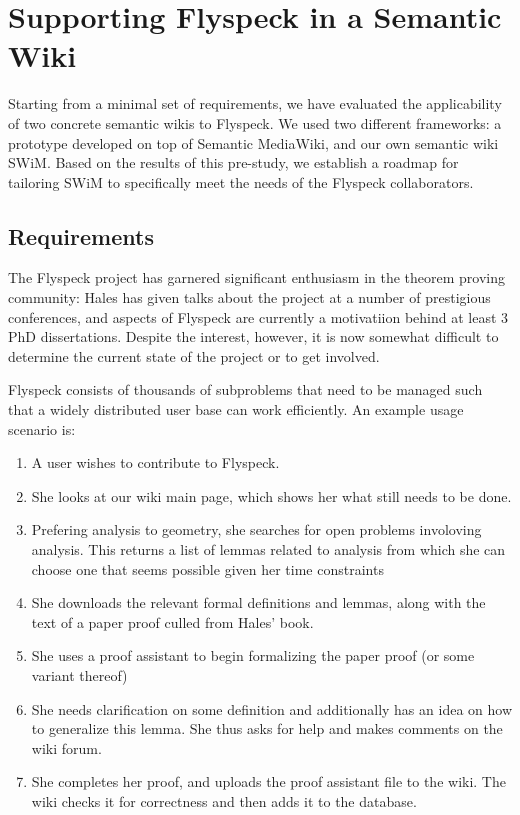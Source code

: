 
\section{Supporting Flyspeck in a Semantic Wiki}

Starting from a minimal set of requirements, we have evaluated the
applicability of two concrete semantic wikis to Flyspeck.  We used two
different frameworks: a prototype developed on top of Semantic
MediaWiki, and our own semantic wiki SWiM.  Based on the results of
this pre-study, we establish a roadmap for tailoring SWiM to
specifically meet the needs of the Flyspeck collaborators.

\subsection{Requirements}
\label{sec:req}

The Flyspeck project has garnered significant enthusiasm in the
theorem proving community: Hales has given talks about the project at
a number of prestigious conferences, and aspects of Flyspeck are
currently a motivatiion behind at least 3 PhD dissertations.  Despite
the interest, however, it is now somewhat difficult to determine the
current state of the project or to get involved.

  Flyspeck consists of thousands of subproblems that need to
be managed such that a widely distributed user base can work efficiently.  
An example usage scenario is:

\begin{enumerate}  
\item A user wishes to contribute to Flyspeck. 
\item She looks at our wiki main page, which shows her what still needs to be done. 
\item Prefering analysis to geometry, she searches for open problems involoving analysis.  
  This returns a list of lemmas related to analysis from which she can choose one that 
  seems possible given her time constraints 
\item She downloads the relevant formal definitions and lemmas, along with the text 
  of a paper proof culled from Hales' book. 
\item She uses a proof assistant to begin formalizing the paper proof (or some variant thereof) 
\item She needs clarification on some definition and additionally has an idea on how to generalize this 
  lemma.  She thus asks for help and makes comments on the wiki forum.   
\item She completes her proof, and uploads the proof assistant file to the wiki. 
  The wiki checks it for correctness and then adds it to the database.  
\end{enumerate}  

